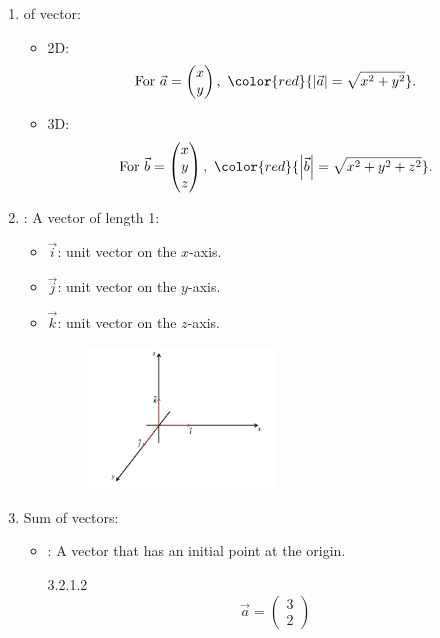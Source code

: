 \documentclass[12pt, a4paper]{article}
\begin{document}
\begin{enumerate}
\begin{itemize}
\begin{figure}[H]
    \end{figure}
  \end{itemize}
  \item \textbf{\color{red}{Magnitude/Modulus}} of vector: 
  \begin{itemize}
    \item 2D: $$\text{For }\vec{a}=\begin{pmatrix}x\\y\end{pmatrix},\ {\color{red}{\left|\vec{a}\right|=\sqrt{x^2+y^2}}}.$$
    \item 3D: $$\text{For }\vec{b}=\begin{pmatrix}x\\y\\z\end{pmatrix},\ {\color{red}{\left|\vec{b}\right|=\sqrt{x^2+y^2+z^2}}}.$$
  \end{itemize}
  \item \textbf{\color{red}{Unit Vector}}: A vector of length 1: 
  \begin{itemize}
    \item $\vec{i}$: unit vector on the $x$-axis.
    \item $\vec{j}$: unit vector on the $y$-axis.
    \item $\vec{k}$: unit vector on the $z$-axis.
    \begin{figure}[H]
      \centering
      \includegraphics[width=0.5\textwidth]{Fig.3.3.jpg}
    \end{figure}
  \end{itemize}
  \item Sum of vectors: 
  \begin{itemize}
    \item \textbf{\color{red}{Position vector}}: A vector that has an initial point at the origin. 
    \begin{example}{3.2.1.2}{}
      $$\vec{a}=\begin{pmatrix}3\\2\end{pmatrix}$$

\end{example}
\end{itemize}
\end{enumerate}
\end{document}
